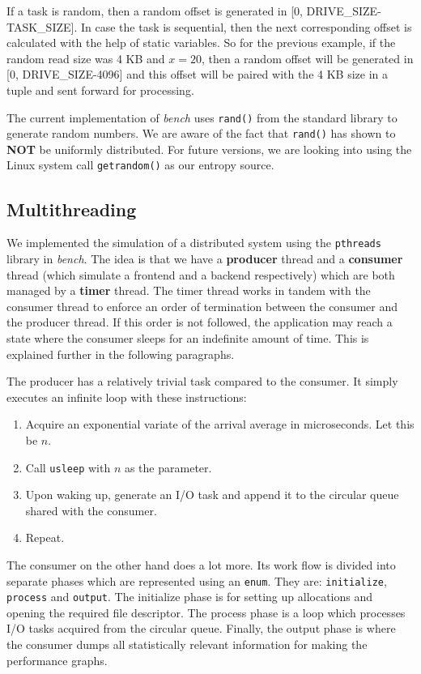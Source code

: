 \documentclass[10pt, author, twocolumn]{article}
\begin{document}
If a task is random, then a random offset is generated in [0, DRIVE\_SIZE-TASK\_SIZE]. In case the task is sequential, then the next corresponding offset is calculated with the help of static variables. So for the previous example, if the random read size was 4 KB and $x = 20$, then a random offset will be generated in [0, DRIVE\_SIZE-4096] and this offset will be paired with the 4 KB size in a tuple and sent forward for processing.

The current implementation of \textit{bench} uses \texttt{rand()} from the standard library to generate random numbers. We are aware of the fact that \texttt{rand()} has shown to \textbf{NOT} be uniformly distributed. For future versions, we are looking into using the Linux system call \texttt{getrandom()} as our entropy source. 

\subsection{Multithreading}
We implemented the simulation of a distributed system using the \texttt{pthreads} library in \textit{bench}. The idea is that we have a \textbf{producer} thread and a \textbf{consumer} thread (which simulate a frontend and a backend respectively) which are both managed by a \textbf{timer} thread. The timer thread works in tandem with the consumer thread to enforce an order of termination between the consumer and the producer thread. If this order is not followed, the application may reach a state where the consumer sleeps for an indefinite amount of time. This is explained further in the following paragraphs.

The producer has a relatively trivial task compared to the consumer. It simply executes an infinite loop with these instructions: 

\begin{enumerate}
    \item Acquire an exponential variate of the arrival average in microseconds. Let this be $n$.
    \item Call \texttt{usleep} with $n$ as the parameter. 
    \item Upon waking up, generate an I/O task and append it to the circular queue shared with the consumer. 
    \item Repeat. 
\end{enumerate}

The consumer on the other hand does a lot more. Its work flow is divided into separate phases which are represented using an \texttt{enum}. They are: \texttt{initialize}, \texttt{process} and \texttt{output}. The initialize phase is for setting up allocations and opening the required file descriptor. The process phase is a loop which processes I/O tasks acquired from the circular queue. Finally, the output phase is where the consumer dumps all statistically relevant information for making the performance graphs. 
\end{document}
